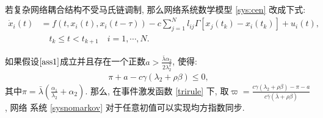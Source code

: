        若复杂网络耦合结构不受马氏链调制, 那么网络系统数学模型 \eqref{sys:cen} 改成下式:
        \begin{align}\label{sysnomarkov}
        \nonumber\dot{x}_{i}(t)&=f(t,x_{i}(t),x_i(t-\tau))-c\sum^N_{j=1}l_{ij}\Gamma[x_{j}(t_k)-x_{i}(t_{k})]+u_i(t),\\
           &\quad t_{k}\leq t< t_{k+1} \quad i = 1,\cdots,N.
        \end{align}
        \begin{cor}
        如果假设$\ref{ass1}$成立并且存在一个正数$a>\frac{\bar{\lambda}\alpha_2}{2\lambda_2^2}$, 使得:
           \begin{align*}
            \pi+a-c\gamma(\lambda_2+\rho\beta)\leq0,
            \end{align*}
        其中$\pi=\bar{\lambda}(\frac{\alpha_1}{\lambda_2}+\alpha_2)$.
        那么, 在事件激发函数 \eqref{trirule} 下, 取$\varpi=\frac{c\gamma(\lambda_2+\rho\beta)-\pi-a}{c\bar\gamma(\bar\lambda+\rho\beta)}$, 网络
        系统 \eqref{sysnomarkov} 对于任意初值可以实现均方指数同步.
        \end{cor}
